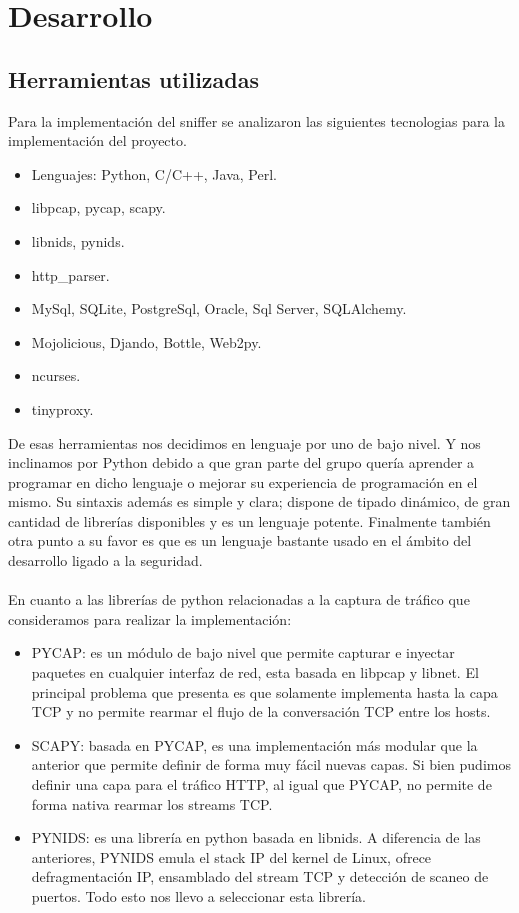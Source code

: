 \section{Desarrollo}

\subsection{Herramientas utilizadas}

Para la implementación del sniffer se analizaron las siguientes tecnologias para la implementación del proyecto.

\begin{itemize}
	\item Lenguajes: Python, C/C++, Java, Perl.
	\item libpcap, pycap, scapy.
	\item libnids, pynids.
	\item http\_parser.
	\item MySql, SQLite, PostgreSql, Oracle, Sql Server, SQLAlchemy.
	\item Mojolicious, Djando, Bottle, Web2py.
	\item ncurses.
	\item tinyproxy.
\end{itemize}

De esas herramientas nos decidimos en lenguaje por uno de bajo nivel. Y nos inclinamos por Python debido a que gran parte del grupo quería aprender a programar en dicho lenguaje o mejorar su experiencia de programación en el mismo. Su sintaxis además es simple y clara; dispone de tipado dinámico, de gran cantidad de librerías disponibles y es un lenguaje potente. Finalmente también otra punto a su favor es que es un lenguaje bastante usado en el ámbito del desarrollo ligado a la seguridad.
\\
\\\indent En cuanto a las librerías de python relacionadas a la captura de tráfico que consideramos para realizar la implementación:

\begin{itemize}
\item PYCAP: es un módulo de bajo nivel que permite capturar e inyectar paquetes en cualquier interfaz de red, esta basada en libpcap y libnet. El principal problema que presenta es que solamente implementa hasta la capa TCP y no permite rearmar el flujo de la conversación TCP entre los hosts.
\item SCAPY: basada en PYCAP, es una implementación más modular que la anterior que permite definir de forma muy fácil nuevas capas. Si bien pudimos definir una capa para el tráfico HTTP, al igual que PYCAP, no permite de forma nativa rearmar los streams TCP.
\item PYNIDS: es una librería en python basada en libnids. A diferencia de las anteriores, PYNIDS emula el stack IP del kernel de Linux, ofrece defragmentación IP, ensamblado del stream TCP y detección de scaneo de puertos. Todo esto nos llevo a seleccionar esta librería.
\end{itemize}

